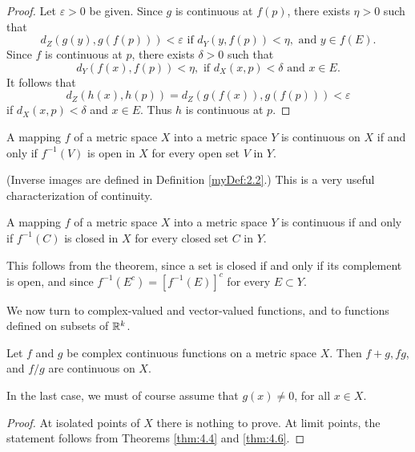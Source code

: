 \begin{proof}
    Let $\varepsilon > 0$ be given. Since $g$ is continuous at $f(p)$, there exists $\eta > 0$ such that 
    \begin{equation*}
        d_Z(g(y), g(f(p))) < \varepsilon \text{ if } d_Y(y,f(p)) < \eta, \text{ and } y \in f(E).
    \end{equation*}
Since $f$ is continuous at $p$, there exists $\delta > 0$ such that
\begin{equation*}
    d_Y(f(x),f(p)) < \eta, \text{ if } d_X(x, p) <\delta \text{ and } x \in E.
\end{equation*}
It follows that
\begin{equation*}
    d_Z(h(x), h(p)) = d_Z(g(f(x)), g(f(p))) < \varepsilon
\end{equation*}
if $d_X(x, p) < \delta$ and $x \in E$. Thus $h$ is continuous at $p$.
\end{proof}

\begin{thm}
    \label{thm:4.8}
    A mapping $f$ of a metric space $X$ into a metric space $Y$ is continuous on $X$ if and only if $f^{-1}(V)$ is open in $X$ for every open set $V$ in $Y$.
\end{thm}

(Inverse images are defined in Definition \ref{myDef:2.2}.) 
This is a very useful characterization of continuity.

\begin{myCorollary*}
    A mapping $f$ of a metric space $X$ into a metric space $Y$ is continuous if and only if $f^{-1} (C)$ is closed in $X$ for every closed set $C$ in $Y$.
\end{myCorollary*}

This follows from the theorem, since a set is closed if and only if its complement is open, and since $f^{-1}(E^c) = [f^{-1}(E)]^c$ for every $E \subset Y$.

We now turn to complex-valued and vector-valued functions, and to
functions defined on subsets of ${\protect\mathbb R}^{k}$.

\begin{thm}
    \label{thm:4.9}
    Let $f$ and $g$ be complex continuous functions on a metric space $X$.
    Then $f + g,fg$, and $f/g$ are continuous on $X$.
    
    In the last case, we must of course assume that $g(x) \neq 0$, for all $x \in  X$.
\end{thm}
\begin{proof}
    At isolated points of $X$ there is nothing to prove. At limit points,
    the statement follows from Theorems \ref{thm:4.4} and \ref{thm:4.6}.
\end{proof}

